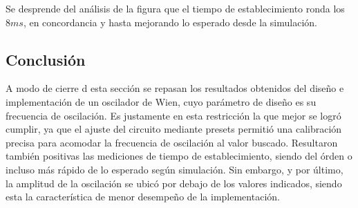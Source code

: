 Se desprende del análisis de la figura que el tiempo de establecimiento ronda los $8ms$, en concordancia y hasta mejorando lo esperado desde la simulación.



\subsection{Conclusión}
A modo de cierre d esta sección se repasan los resultados obtenidos del diseño e implementación de un oscilador de Wien, cuyo parámetro de diseño es su 
frecuencia de oscilación.
Es justamente en esta restricción la que mejor se logró cumplir, ya que el ajuste del circuito mediante presets permitió una calibración precisa para acomodar 
la frecuencia de oscilación al valor buscado.
Resultaron también positivas las mediciones de tiempo de establecimiento, siendo del órden o incluso más rápido de lo esperado según simulación.
Sin embargo, y por último, la amplitud de la oscilación se ubicó por debajo de los valores indicados, siendo esta la característica de menor desempeño de la 
implementación.